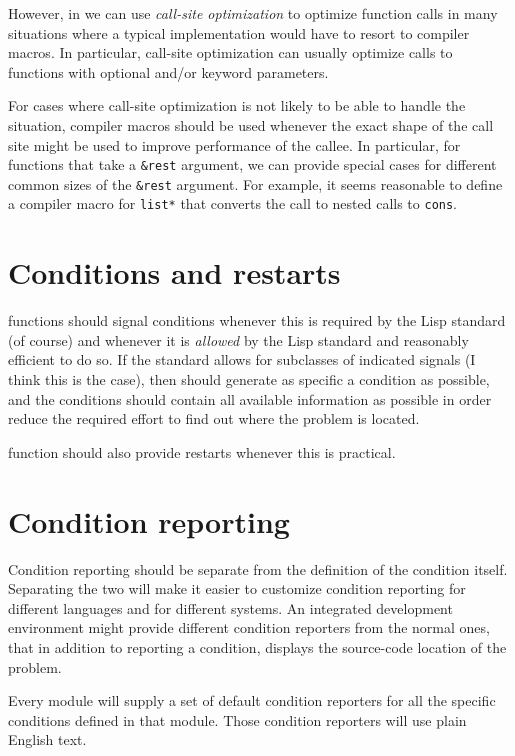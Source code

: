 However, in \sysname{} we can use \emph{call-site optimization} to
optimize function calls in many situations where a typical
\commonlisp{} implementation would have to resort to compiler macros.
In particular, call-site optimization can usually optimize calls to
functions with optional and/or keyword parameters.

For cases where call-site optimization is not likely to be able to
handle the situation, compiler macros should be used whenever the
exact shape of the call site might be used to improve performance of
the callee. In particular, for functions that take a \texttt{\&rest}
argument, we can provide special cases for different common sizes of
the \texttt{\&rest} argument.  For example, it seems reasonable to
define a compiler macro for \texttt{list*} that converts the call to
nested calls to \texttt{cons}.

\section{Conditions and restarts}

\sysname{} functions should signal conditions whenever this is
required by the Lisp standard (of course) and whenever it is
\emph{allowed} by the Lisp standard and reasonably efficient to do so.
If the standard allows for subclasses of indicated signals (I think
this is the case), then \sysname{} should generate as specific a
condition as possible, and the conditions should contain all available
information as possible in order reduce the required effort to
find out where the problem is located.

\sysname{} function should also provide restarts whenever this is
practical. 

\section{Condition reporting}

Condition reporting should be separate from the definition of the
condition itself.  Separating the two will make it easier to customize
condition reporting for different languages and for different
systems.  An integrated development environment might provide
different condition reporters from the normal ones, that in addition
to reporting a condition, displays the source-code location of the
problem. 

Every \sysname{} module will supply a set of default condition
reporters for all the specific conditions defined in that module.
Those condition reporters will use plain English text. 

